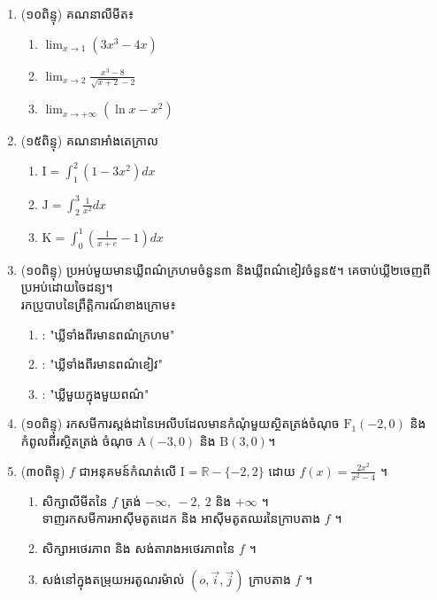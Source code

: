 \documentclass{officialexam}
\begin{document}
\newpage 
\maketitle
\begin{enumerate}[I]
\item (១០ពិន្ទុ)  គណនាលីមីត៖

\begin{enumerate}[k,3]
\item  $\lim_{x\to 1}\left(3x^3-4x\right)$
\item  $\lim_{x\to 2}\frac{x^3-8}{\sqrt{x+2}-2}$
\item  $\lim_{x\to +\infty}\left(\ln x-x^2\right)$
\end{enumerate}


\item (១៥ពិន្ទុ)  គណនាអាំងតេក្រាល
		\begin{enumerate}[k,3]
		\item $\mathrm{I}=\int_1^2\left(1-3x^2\right)dx$
		\item $\mathrm{J}=\int_2^3\frac{1}{x^2}dx$
		\item $\mathrm{K}=\int_0^1\left(\frac{1}{x+e}-1\right)dx $
		\end{enumerate}

\item (១០ពិន្ទុ)   ប្រអប់មួយមានឃ្លីពណ៌ក្រហមចំនួន៣ និងឃ្លីពណ៌ខៀវចំនួន៥។  គេចាប់ឃ្លី២ចេញពីប្រអប់ដោយចៃដន្យ។\\ រកប្រូបាបនៃព្រឹត្តិការណ៍ខាងក្រោម៖
\begin{enumerate}[A]
\item : "ឃ្លីទាំងពីរមានពណ៌ក្រហម"
\item : "ឃ្លីទាំងពីរមានពណ៌ខៀវ"
\item : "ឃ្លីមួយក្នុងមួយពណ៌"
\end{enumerate}
\item (១០ពិន្ទុ)  រកសមីការស្តង់ដានៃអេលីបដែលមានកំណុំមួយស្ថិតត្រង់ចំណុច $\mathrm{F_1}(-2,0)$ និង កំពូលពីរស្ថិតត្រង់ ចំណុច $\mathrm{A}(-3,0)$ និង $\mathrm{B}(3,0)$។
\item (៣០ពិន្ទុ)   $f$ ជាអនុគមន៍កំណត់លើ $\mathrm{I}=\mathbb{R}-\{-2,2\}$ ដោយ $f(x)=\frac{2x^2}{x^2-4}$ ។
\begin{enumerate}[k]
\item សិក្សាលីមីតនៃ $f$ ត្រង់ $-\infty,\ -2,\ 2 $ និង $+\infty$ ។\\ 
 ទាញរកសមីការអាស៊ីមតូតដេក និង អាស៊ីមតូតឈរនៃក្រាបតាង $f$ ។
\item សិក្សាអថេរភាព និង សង់តារាងអថេរភាពនៃ $f$ ។
\item សង់នៅក្នុងតម្រុយអរតូណរម៉ាល់ $\left(o,\overrightarrow{i},\overrightarrow{j}\right)$ ក្រាបតាង $f$ ។
\end{enumerate}
\end{enumerate}
\end{document}
